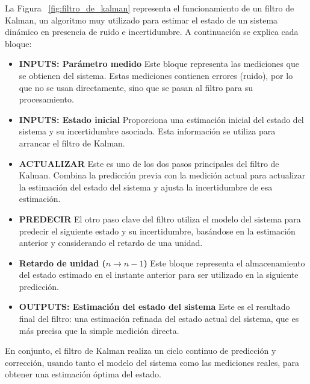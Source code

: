 \documentclass[11pt,spanish,listoffigures,listoftables]{tfgetsinf}
\begin{document}
La Figura ~\ref{fig:filtro_de_kalman} representa el funcionamiento de un filtro de Kalman, un algoritmo muy utilizado para estimar el estado de un sistema dinámico en presencia de ruido e incertidumbre. A continuación se explica cada bloque:

\begin{itemize}
   \item \textbf{INPUTS: Parámetro medido}
   Este bloque representa las mediciones que se obtienen del sistema. Estas mediciones contienen errores (ruido), por lo que no se usan directamente, sino que se pasan al filtro para su procesamiento.

   \item \textbf{INPUTS: Estado inicial}
   Proporciona una estimación inicial del estado del sistema y su incertidumbre asociada. Esta información se utiliza para arrancar el filtro de Kalman.

   \item \textbf{ACTUALIZAR}
   Este es uno de los dos pasos principales del filtro de Kalman. Combina la predicción previa con la medición actual para actualizar la estimación del estado del sistema y ajusta la incertidumbre de esa estimación.

   \item \textbf{PREDECIR}
   El otro paso clave del filtro utiliza el modelo del sistema para predecir el siguiente estado y su incertidumbre, basándose en la estimación anterior y considerando el retardo de una unidad.

   \item \textbf{Retardo de unidad (\(n \rightarrow n{-}1\))}
   Este bloque representa el almacenamiento del estado estimado en el instante anterior para ser utilizado en la siguiente predicción.

   \item \textbf{OUTPUTS: Estimación del estado del sistema}
   Este es el resultado final del filtro: una estimación refinada del estado actual del sistema, que es más precisa que la simple medición directa.
\end{itemize}

En conjunto, el filtro de Kalman realiza un ciclo continuo de predicción y corrección, usando tanto el modelo del sistema como las mediciones reales, para obtener una estimación óptima del estado.
\end{document}
